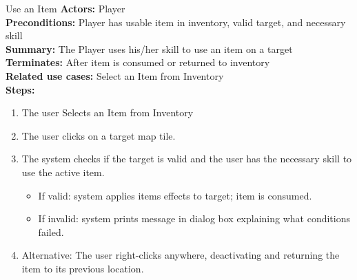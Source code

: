 \documentclass[12pt]{report}
\begin{document}
\begin{subsection}{Use an Item}
\textbf{Actors:} Player \\
\textbf{Preconditions:} Player has usable item in inventory, valid target, and necessary skill \\
\textbf{Summary:} The Player uses his/her skill to use an item on a target \\
\textbf{Terminates:} After item is consumed or returned to inventory \\
\textbf{Related use cases:} Select an Item from Inventory \\
\textbf{Steps:}

\begin{enumerate}
	\item The user Selects an Item from Inventory
	\item The user clicks on a target map tile.
	\item The system checks if the target is valid and the user has the necessary skill to use the active item.
	\begin{itemize}
		\item If valid: system applies items effects to target; item is consumed.
		\item If invalid:  system prints message in dialog box explaining what conditions failed.
	\end{itemize}
	\item Alternative: The user right-clicks anywhere, deactivating and returning the item to its previous location.
\end{enumerate}

\end{subsection}
\end{document}

